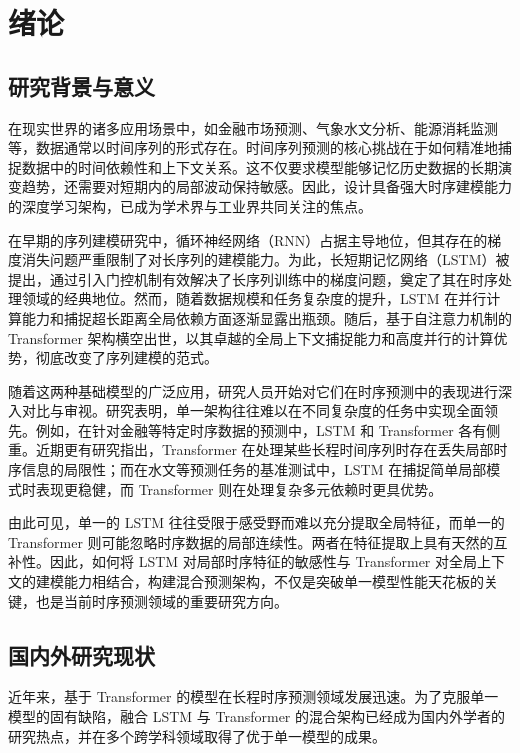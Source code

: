 \documentclass[UTF8,AutoFakeBold=1,AutoFakeSlant,zihao=-4]{SCAU}
\begin{document}
\section{绪论}
\subsection{研究背景与意义}
在现实世界的诸多应用场景中，如金融市场预测、气象水文分析、能源消耗监测等，数据通常以时间序列的形式存在。时间序列预测的核心挑战在于如何精准地捕捉数据中的时间依赖性和上下文关系。这不仅要求模型能够记忆历史数据的长期演变趋势，还需要对短期内的局部波动保持敏感。因此，设计具备强大时序建模能力的深度学习架构，已成为学术界与工业界共同关注的焦点。

在早期的序列建模研究中，循环神经网络（RNN）占据主导地位，但其存在的梯度消失问题严重限制了对长序列的建模能力。为此，长短期记忆网络（LSTM）被提出，通过引入门控机制有效解决了长序列训练中的梯度问题，奠定了其在时序处理领域的经典地位\citep{hochreiter1997long}。然而，随着数据规模和任务复杂度的提升，LSTM 在并行计算能力和捕捉超长距离全局依赖方面逐渐显露出瓶颈。随后，基于自注意力机制的 Transformer 架构横空出世，以其卓越的全局上下文捕捉能力和高度并行的计算优势，彻底改变了序列建模的范式\citep{vaswani2017attention}。

随着这两种基础模型的广泛应用，研究人员开始对它们在时序预测中的表现进行深入对比与审视。研究表明，单一架构往往难以在不同复杂度的任务中实现全面领先。例如，在针对金融等特定时序数据的预测中，LSTM 和 Transformer 各有侧重\citep{hollis2018comparison}。近期更有研究指出，Transformer 在处理某些长程时间序列时存在丢失局部时序信息的局限性\citep{alharthi2024xlstmtime}；而在水文等预测任务的基准测试中，LSTM 在捕捉简单局部模式时表现更稳健，而 Transformer 则在处理复杂多元依赖时更具优势\citep{liu2025rnns}。

由此可见，单一的 LSTM 往往受限于感受野而难以充分提取全局特征，而单一的 Transformer 则可能忽略时序数据的局部连续性。两者在特征提取上具有天然的互补性。因此，如何将 LSTM 对局部时序特征的敏感性与 Transformer 对全局上下文的建模能力相结合，构建混合预测架构，不仅是突破单一模型性能天花板的关键，也是当前时序预测领域的重要研究方向。

\subsection{国内外研究现状}
近年来，基于 Transformer 的模型在长程时序预测领域发展迅速\citep{su2025systematic}。为了克服单一模型的固有缺陷，融合 LSTM 与 Transformer 的混合架构已经成为国内外学者的研究热点，并在多个跨学科领域取得了优于单一模型的成果。
\end{document}
